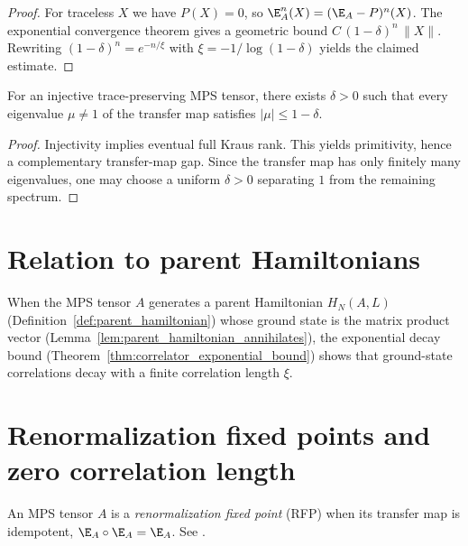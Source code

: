 \begin{proof}
    \leanok
    For traceless $X$ we have $P(X) = 0$, so $\E_A^n(X) = (\E_A - P)^n(X)$.
    The exponential convergence theorem gives a geometric bound
    $C\,(1-\delta)^n\,\|X\|$. Rewriting $(1-\delta)^n = e^{-n/\xi}$ with
    $\xi = -1/\log(1-\delta)$ yields the claimed estimate.
\end{proof}

\begin{theorem}%
    \label{thm:transfer_map_gap_wielandt}
    \leanok
    For an injective trace-preserving MPS tensor, there exists
    $\delta > 0$ such that every eigenvalue $\mu \neq 1$ of the
    transfer map satisfies $|\mu| \le 1 - \delta$.
\end{theorem}
\begin{proof}
    \leanok
    Injectivity implies eventual full Kraus rank. This yields primitivity,
    hence a complementary transfer-map gap. Since the transfer map has
    only finitely many eigenvalues, one may choose a uniform
    $\delta > 0$ separating $1$ from the remaining spectrum.
\end{proof}

\section{Relation to parent Hamiltonians}

\begin{remark}\label{rem:correlations_parent_hamiltonian}
    When the MPS tensor $A$ generates a parent Hamiltonian $H_N(A,L)$
    (Definition~\ref{def:parent_hamiltonian}) whose ground state is the
    matrix product vector (Lemma~\ref{lem:parent_hamiltonian_annihilates}),
    the exponential decay bound
    (Theorem~\ref{thm:correlator_exponential_bound}) shows that ground-state
    correlations decay with a finite correlation length $\xi$.
\end{remark}

\section{Renormalization fixed points and zero correlation length}

\begin{definition}\label{def:is_rfp}
    \leanok
    An MPS tensor $A$ is a \emph{renormalization fixed point} (RFP) when its
    transfer map is idempotent, $\E_A \circ \E_A = \E_A$.
    See \cite[Definition~3.2]{Cirac2016MPDO_arXiv}.
\end{definition}

